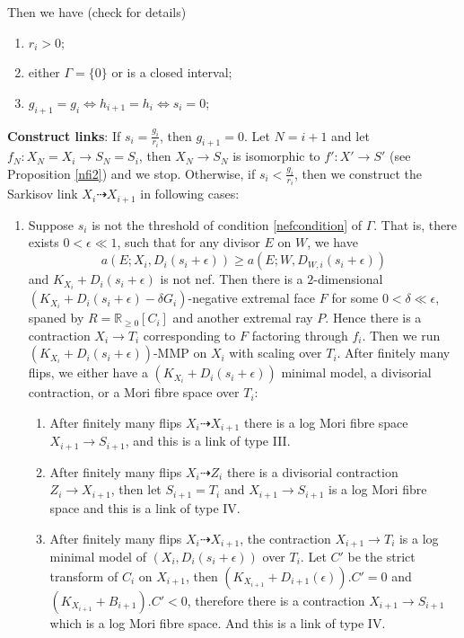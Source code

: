 \documentclass{article}
\begin{document}
Then we have (check \cite[Lemma 4.4]{liuSarkisovProgramGeneralized2019} for details)
\begin{enumerate}
    \item $r_{i}>0$;
    \item either $\Gamma=\{0\} $ or is a closed interval;
    \item $g_{i+1}=g_{i} \Leftrightarrow h_{i+1}=h_{i} \Leftrightarrow s_{i}=0$;
\end{enumerate}
\textbf{Construct links}: If $s_{i}=\frac{g_{i}}{r_{i}}$, then $g_{i+1}=0$. Let $N=i+1$  and let $f_{N}:X_{N}=X_{i} \to S_{N}=S_{i}$, then $X_{N}\to S_{N}$ is isomorphic to $f':X'\to S'$ (see Proposition \ref{nfi2}) and  we stop. Otherwise, if  $s_{i}<\frac{g_{i}}{r_{i}}$, then we construct the Sarkisov link $X_{i}\dashrightarrow X_{i+1}$ in following cases:
\begin{enumerate}
  \item\label{2a} Suppose $s_{i}$ is not the threshold of  condition \ref{nefcondition} of $\Gamma$. That is, there exists $0<\epsilon\ll 1$, such that for any divisor $E$ on $W$, we have
    \[
      a(E;X_{i},D_{i}(s_{i}+\epsilon))\geqslant a(E;W,D_{W,i}(s_{i}+\epsilon))
    \]
    and $K_{X_{i}}+D_{i}(s_{i}+\epsilon)$ is not nef. Then there is a $2$-dimensional $(K_{X_{i}}+D_{i}(s_{i}+\epsilon)-\delta G_{i})$-negative extremal face $F$ for some $0< \delta \ll \epsilon $, spaned by $R=\mathbb{R}_{\geqslant 0}[C_{i}]$ and another extremal ray $P$. Hence there is a contraction $X_{i}\to T_{i}$ corresponding to $F$ factoring through $f_{i}$. Then we run $(K_{X_{i}}+D_{i}(s_{i}+\epsilon))$-MMP on $X_{i}$ with scaling over $T_{i}$. After finitely many flips, we either have a $(K_{X_{i}}+D_{i}(s_{i}+\epsilon))$ minimal model, a divisorial contraction, or a Mori fibre space over $T_{i}$: 
    \begin{enumerate}
    \item\label{2a1}After finitely many flips $X_{i}\dashrightarrow X_{i+1}$ there is a log Mori fibre space $X_{i+1}\to S_{i+1}$, and this is a link of type III.
    \item\label{2a2} After finitely many flips $X_{i}\dashrightarrow Z_{i}$ there is a divisorial contraction $Z_{i}\to X_{i+1}$, then let $S_{i+1}=T_{i}$ and $X_{i+1}\to S_{i+1}$ is a log Mori fibre space and this is a link of type IV.
    \item \label{2a3}After finitely many flips $X_{i}\dashrightarrow X_{i+1}$,  the contraction $X_{i+1}\to T_{i}$ is a log minimal model of $\left(X_{i},D_{i}\left(s_{i}+\epsilon\right)\right)$ over $T_{i}$. Let  $C'$ be the strict transform of  $C_{i}$ on $X_{i+1}$, then $(K_{X_{i+1}}+D_{i+1}(\epsilon)).C'=0$ and $(K_{X_{i+1}}+B_{i+1}).C'<0$, therefore there is a contraction  $X_{i+1} \to S_{i+1}$ which is a log Mori fibre space. And this is a link of type IV. 

\end{enumerate}
\end{enumerate}
\end{document}
